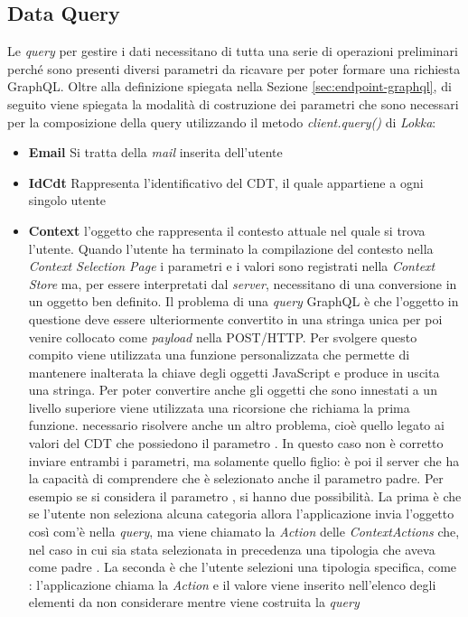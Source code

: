 \subsection{Data Query} \label{sec:data-query}

Le \emph{query} per gestire i dati necessitano di tutta una serie di operazioni preliminari perché sono presenti diversi parametri da ricavare per poter formare una richiesta GraphQL. Oltre alla definizione spiegata nella Sezione \ref{sec:endpoint-graphql}, di seguito viene spiegata la modalità di costruzione dei parametri che sono necessari per la composizione della query utilizzando il metodo \emph{client.query()} di \emph{Lokka}:

\begin{itemize}
	\item \textbf{Email}
	Si tratta della \emph{mail} inserita dell'utente
	\item \textbf{IdCdt}
	Rappresenta l'identificativo del CDT, il quale appartiene a ogni singolo utente
	\item \textbf{Context}
	\upe l'oggetto che rappresenta il contesto attuale nel quale si trova l'utente. Quando l'utente ha terminato la compilazione del contesto nella \emph{Context Selection Page} i parametri e i valori sono registrati nella \emph{Context Store} ma, per essere interpretati dal \emph{server}, necessitano di una conversione in un oggetto ben definito. Il problema di una \emph{query} GraphQL è che l'oggetto in questione deve essere ulteriormente convertito in una stringa unica per poi venire collocato come \textit{payload} nella POST/HTTP. Per svolgere questo compito viene utilizzata una funzione personalizzata che permette di mantenere inalterata la chiave degli oggetti JavaScript e produce in uscita una stringa. Per poter convertire anche gli oggetti che sono innestati a un livello superiore viene utilizzata una ricorsione che richiama la prima funzione. \upe necessario risolvere anche un altro problema, cioè quello legato ai valori del CDT che possiedono il parametro . In questo caso non è corretto inviare entrambi i parametri, ma solamente quello figlio: è poi il server che ha la capacità di comprendere che è selezionato anche il parametro padre. Per esempio se si considera il parametro , si hanno due possibilità. La prima è che se l'utente non seleziona alcuna categoria allora l'applicazione invia l'oggetto così com'è nella \textit{query}, ma viene chiamato la \emph{Action} delle \emph{ContextActions}  che, nel caso in cui sia stata selezionata in precedenza una tipologia che aveva come padre   . La seconda è che l'utente selezioni una tipologia specifica, come : l'applicazione chiama la \emph{Action}  e il valore  viene inserito nell'elenco degli elementi da non considerare mentre viene costruita la \textit{query}

\end{itemize}
